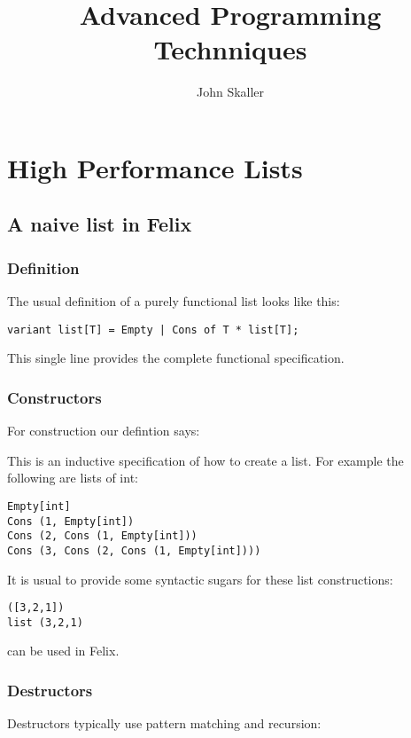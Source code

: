 \documentclass[oneside]{book}
\title{Advanced Programming Technniques}
\author{John Skaller}
\begin{document}
\maketitle
\tableofcontents

\chapter{High Performance Lists}
\section{A naive list in Felix}
\subsection{Definition}
The usual definition of a purely functional list 
looks like this:

\begin{verbatim}
variant list[T] = Empty | Cons of T * list[T];
\end{verbatim}

This single line provides the complete functional specification.

\subsection{Constructors}
For construction our defintion says:


This is an inductive specification of how to create a list.
For example the following are lists of int:

\begin{verbatim}
Empty[int]
Cons (1, Empty[int])
Cons (2, Cons (1, Empty[int]))
Cons (3, Cons (2, Cons (1, Empty[int])))
\end{verbatim}

It is usual to provide some syntactic sugars for these list constructions:

\begin{verbatim}
([3,2,1])
list (3,2,1)
\end{verbatim}
can be used in Felix.

\subsection{Destructors}
Destructors typically use pattern matching and recursion:
\end{document}
